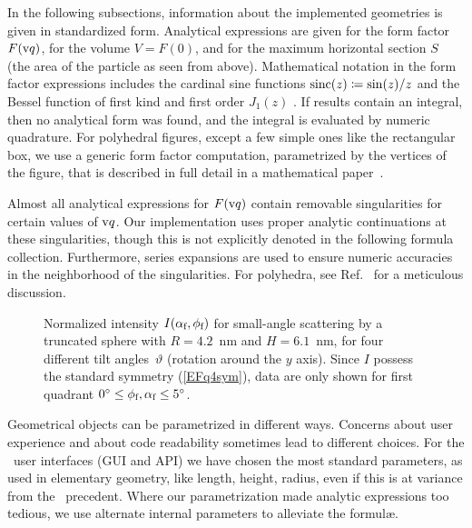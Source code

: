 
In the following subsections,
information about the implemented geometries is given in standardized form.
Analytical expressions are given for the form factor $F(\q)$,
for the volume $V=F(0)$,
and for the maximum horizontal section $S$
(the area of the particle as seen from above).
%
Mathematical notation in the form factor expressions includes
the cardinal sine functions $\sinc(z)\coloneqq\sin(z)/z$
and the Bessel function of first kind and first order $J_1(z)$
\cite[Ch.~9]{AbSt64}.
%
If results contain an integral,
then no analytical form was found,
and the integral is evaluated by numeric quadrature.
%
For polyhedral figures,
except a few simple ones like the rectangular box,
we use a generic form factor computation,
parametrized by the vertices of the figure,
that is described in full detail in a mathematical paper~\cite{ba:ffp}.

Almost all analytical expressions for $F(\q)$ contain
removable singularities for certain values of $\q$.
Our implementation uses proper analytic continuations at these singularities,
though this is not explicitly denoted in the following formula collection.
Furthermore, series expansions are used to ensure numeric accuracies
in the neighborhood of the singularities.
For polyhedra, see Ref.~\cite{ba:ffp} for a meticulous discussion.

\begin{figure}[t]
\begin{center}
\end{center}
\caption{Normalized intensity $I(\alpha_\sf,\phi_\sf)$
for small-angle scattering by a truncated sphere with $R=4.2$~nm and $H=6.1$~nm,
for four different tilt angles~$\vartheta$ (rotation around the $y$ axis).
Since $I$ possess the standard symmetry (\protect\ref{EFq4sym}),
data are only shown for first quadrant $0^\circ\le\phi_\sf,\alpha_\sf\le 5^\circ$.}
\label{F1quadrants}
\end{figure}

Geometrical objects can be parametrized in different ways.
Concerns about user experience and about code readability
sometimes lead to different choices.
For the \BornAgain\ user interfaces (GUI and API)
we have chosen the most standard parameters,
as used in elementary geometry, like length, height, radius,
even if this is at variance from the \IsGISAXS\ precedent.
Where our parametrization made analytic expressions too tedious,
we use alternate internal parameters to alleviate the formul\ae.

